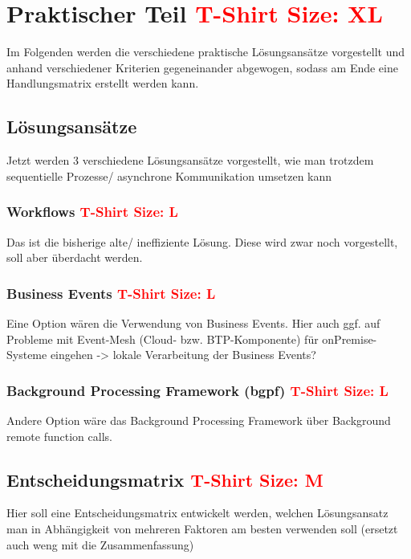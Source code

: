 \chapter{Praktischer Teil \textcolor{red}{T-Shirt Size: XL}}

Im Folgenden werden die verschiedene praktische Lösungsansätze vorgestellt und anhand verschiedener Kriterien gegeneinander abgewogen, sodass am Ende eine Handlungsmatrix erstellt werden kann.

\section{Lösungsansätze}

Jetzt werden 3 verschiedene Lösungsansätze vorgestellt, wie man trotzdem sequentielle Prozesse/ asynchrone Kommunikation umsetzen kann

\subsection{Workflows \textcolor{red}{T-Shirt Size: L}}

Das ist die bisherige alte/ ineffiziente Lösung. Diese wird zwar noch vorgestellt, soll aber überdacht werden.

\subsection{Business Events \textcolor{red}{T-Shirt Size: L}}

Eine Option wären die Verwendung von Business Events. Hier auch ggf. auf Probleme mit Event-Mesh (Cloud- bzw. BTP-Komponente) für onPremise-Systeme eingehen -> lokale Verarbeitung der Business Events? 

\subsection{Background Processing Framework (bgpf) \textcolor{red}{T-Shirt Size: L}}

Andere Option wäre das Background Processing Framework über Background remote function calls.

\section{Entscheidungsmatrix \textcolor{red}{T-Shirt Size: M}}

Hier soll eine Entscheidungsmatrix entwickelt werden, welchen Lösungsansatz man in Abhängigkeit von mehreren Faktoren am besten verwenden soll (ersetzt auch weng mit die Zusammenfassung)